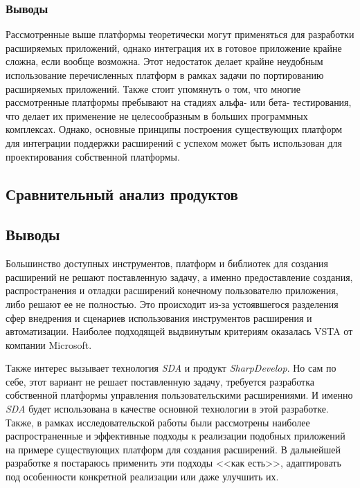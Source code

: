 






\subsubsection{Выводы}

Рассмотренные выше платформы теоретически могут применяться для разработки расширяемых приложений, однако интеграция их в готовое приложение крайне сложна, если вообще возможна. Этот недостаток делает крайне неудобным использование перечисленных платформ в рамках задачи по портированию расширяемых приложений. Также стоит упомянуть о том, что многие рассмотренные платформы пребывают на стадиях альфа- или бета- тестирования, что делает их применение не целесообразным в больших программных комплексах. Однако, основные принципы построения существующих платформ для интеграции поддержки расширений с успехом может быть использован для проектирования собственной платформы.

\subsection{Сравнительный анализ продуктов}




\subsection{Выводы}

Большинство доступных инструментов, платформ и библиотек для создания расширений не решают поставленную задачу, а именно предоставление создания, распространения и отладки расширений конечному пользователю приложения, либо решают ее не полностью. Это происходит из-за устоявшегося разделения сфер внедрения и сценариев использования инструментов расширения и автоматизации. Наиболее подходящей выдвинутым критериям оказалась VSTA от компании Microsoft.

Также интерес вызывает технология {\it SDA} и продукт {\it SharpDevelop}. Но сам по себе, этот вариант не решает поставленную задачу, требуется разработка собственной платформы управления пользовательскими расширениями. И именно {\it SDA} будет использована в качестве основной технологии в этой разработке. Также, в рамках исследовательской работы были рассмотрены наиболее распространенные и эффективные подходы к реализации подобных приложений на примере существующих платформ для создания расширений. В дальнейшей разработке я постараюсь применить эти подходы <<как есть>>, адаптировать под особенности конкретной реализации или даже улучшить их.

